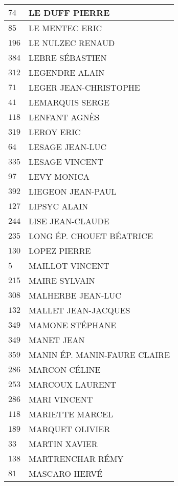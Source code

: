 \begin{xltabular}{\linewidth}{|l|X|}
    \hline
    $74$ & LE DUFF PIERRE \\
    \hline
    $85$ & LE MENTEC ERIC \\
    \hline
    $196$ & LE NULZEC RENAUD \\
    \hline
    $384$ & LEBRE SÉBASTIEN \\
    \hline
    $312$ & LEGENDRE ALAIN \\
    \hline
    $71$ & LEGER JEAN-CHRISTOPHE \\
    \hline
    $41$ & LEMARQUIS SERGE \\
    \hline
    $118$ & LENFANT AGNÈS \\
    \hline
    $319$ & LEROY ERIC \\
    \hline
    $64$ & LESAGE JEAN-LUC \\
    \hline
    $335$ & LESAGE VINCENT \\
    \hline
    $97$ & LEVY MONICA \\
    \hline
    $392$ & LIEGEON JEAN-PAUL \\
    \hline
    $127$ & LIPSYC ALAIN \\
    \hline
    $244$ & LISE JEAN-CLAUDE \\
    \hline
    $235$ & LONG ÉP. CHOUET BÉATRICE \\
    \hline
    $130$ & LOPEZ PIERRE \\
    \hline
    $5$ & MAILLOT VINCENT \\
    \hline
    $215$ & MAIRE SYLVAIN \\
    \hline
    $308$ & MALHERBE JEAN-LUC \\
    \hline
    $132$ & MALLET JEAN-JACQUES \\
    \hline
    $349$ & MAMONE STÉPHANE \\
    \hline
    $349$ & MANET JEAN \\
    \hline
    $359$ & MANIN ÉP. MANIN-FAURE CLAIRE \\
    \hline
    $286$ & MARCON CÉLINE \\
    \hline
    $253$ & MARCOUX LAURENT \\
    \hline
    $286$ & MARI VINCENT \\
    \hline
    $118$ & MARIETTE MARCEL \\
    \hline
    $189$ & MARQUET OLIVIER \\
    \hline
    $33$ & MARTIN XAVIER \\
    \hline
    $138$ & MARTRENCHAR RÉMY \\
    \hline
    $81$ & MASCARO HERVÉ \\

\end{xltabular}
